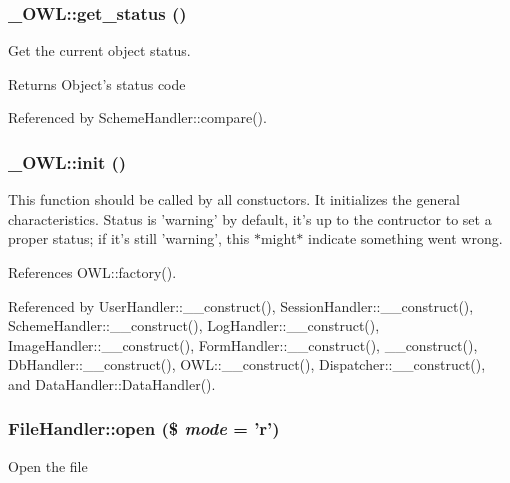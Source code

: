 \subsubsection[{get\_\-status}]{\setlength{\rightskip}{0pt plus 5cm}\_\-OWL::get\_\-status ()}\label{class__OWL_a99ec771fa2c5c279f80152cc09e489a8}
Get the current object status.

\begin{DoxyReturn}{Returns}
Object's status code 
\end{DoxyReturn}


Referenced by SchemeHandler::compare().

\subsubsection[{init}]{\setlength{\rightskip}{0pt plus 5cm}\_\-OWL::init ()}\label{class__OWL_ae0ef3ded56e8a6b34b6461e5a721cd3e}
This function should be called by all constuctors. It initializes the general characteristics. Status is 'warning' by default, it's up to the contructor to set a proper status; if it's still 'warning', this $\ast$might$\ast$ indicate something went wrong. 

References OWL::factory().



Referenced by UserHandler::\_\-\_\-construct(), SessionHandler::\_\-\_\-construct(), SchemeHandler::\_\-\_\-construct(), LogHandler::\_\-\_\-construct(), ImageHandler::\_\-\_\-construct(), FormHandler::\_\-\_\-construct(), \_\-\_\-construct(), DbHandler::\_\-\_\-construct(), OWL::\_\-\_\-construct(), Dispatcher::\_\-\_\-construct(), and DataHandler::DataHandler().

\subsubsection[{open}]{\setlength{\rightskip}{0pt plus 5cm}FileHandler::open (\$ {\em mode} = {\ttfamily 'r'})}\label{classFileHandler_a2a650b033c4eb1f98ba47fb05ce7b454}
Open the file


